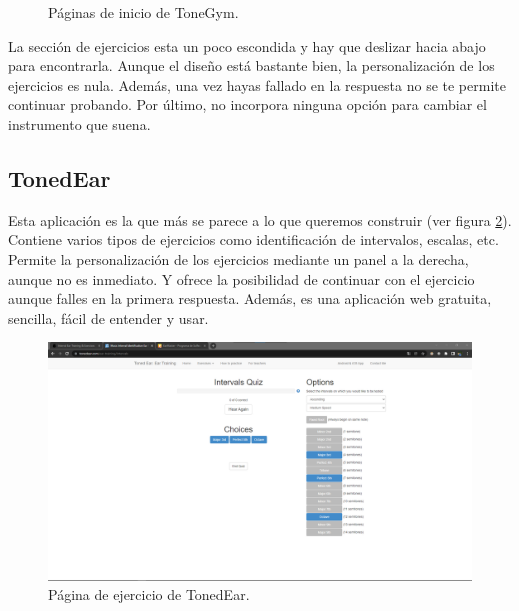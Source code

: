 \documentclass[12pt,twoside,titlepage]{report}
\begin{document}
\begin{figure}[H]
    \centering
    \caption{Páginas de inicio de ToneGym.}
    \label{f:ToneGym2}
   \end{figure}

La sección de ejercicios esta un poco escondida y hay que deslizar hacia abajo para encontrarla. Aunque el diseño está bastante bien, la personalización de los ejercicios es nula. Además, una vez hayas fallado en la respuesta no se te permite continuar probando. Por último, no incorpora ninguna opción para cambiar el instrumento que suena.

\subsection{TonedEar}

Esta aplicación es la que más se parece a lo que queremos construir (ver figura \ref{fig:tonedear}). Contiene varios tipos de ejercicios como identificación de intervalos, escalas, etc. Permite la personalización de los ejercicios mediante un panel a la derecha, aunque no es inmediato. Y ofrece la posibilidad de continuar con el ejercicio aunque falles en la primera respuesta. Además, es una aplicación web gratuita, sencilla, fácil de entender y usar.

\begin{figure}[H] 
    \includegraphics[scale=0.25]{Estado del Arte/tonedear}
    \centering
    \caption{Página de ejercicio de TonedEar.}
    \label{fig:tonedear}
\end{figure}
\end{document}
